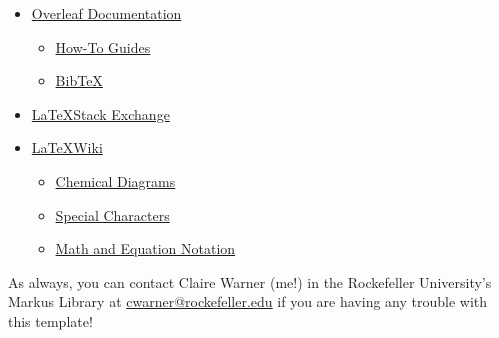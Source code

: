 \begin{itemize}
    \item \href{https://www.overleaf.com/learn}{Overleaf Documentation}
    \begin{itemize}
        \item \href{https://www.overleaf.com/learn/how-to}{How-To Guides}
        \item \href{https://www.overleaf.com/learn/latex/Bibliography_management_with_bibtex}{BibTeX}
    \end{itemize}
    \item \href{https://tex.stackexchange.com/}{\LaTeX Stack Exchange}
    \item \href{https://en.wikibooks.org/wiki/LaTeX}{\LaTeX Wiki}
    \begin{itemize}
        \item \href{https://en.wikibooks.org/wiki/LaTeX/Chemical_Graphics}{Chemical Diagrams}
        \item \href{https://en.wikibooks.org/wiki/LaTeX/Special_Characters}{Special Characters}
        \item \href{https://en.wikibooks.org/wiki/LaTeX/Mathematics}{Math and Equation Notation}
    \end{itemize}
\end{itemize}

As always, you can contact Claire Warner (me!) in the Rockefeller University's Markus Library at \url{cwarner@rockefeller.edu} if you are having any trouble with this template!